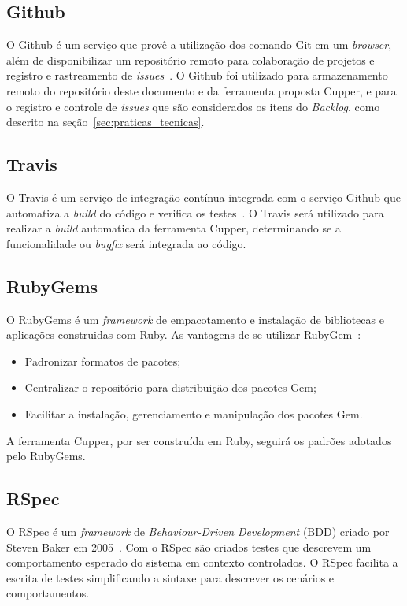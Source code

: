 \subsection{Github}

O Github é um serviço que provê a utilização dos comando Git em um \textit{browser}, além de
disponibilizar um repositório remoto para colaboração de projetos e registro e rastreamento de
\textit{issues}~\cite{github:2016}.  O Github foi utilizado para armazenamento remoto do repositório
deste documento e da ferramenta proposta Cupper, e para o registro e controle de \textit{issues} que são
considerados os itens do \textit{Backlog}, como descrito na seção~\ref{sec:praticas_tecnicas}.

\subsection{Travis}

O Travis é um serviço de integração contínua integrada com o serviço Github que automatiza
a \textit{build} do código e verifica os testes~\cite{travis:2016}. O Travis será utilizado para
realizar a \textit{build} automatica da ferramenta Cupper, determinando se a funcionalidade ou \textit{bugfix}
será integrada ao código.

\subsection{RubyGems}

O RubyGems é um \textit{framework} de empacotamento e instalação de bibliotecas e aplicações
construidas com Ruby. As vantagens de se utilizar RubyGem~\cite{thomas:2001}:

\begin{itemize}
 \item Padronizar formatos de pacotes;
 \item Centralizar o repositório para distribuição dos pacotes Gem;
 \item Facilitar a instalação, gerenciamento e manipulação dos pacotes Gem.
\end{itemize}

A ferramenta Cupper, por ser construída em Ruby, seguirá os padrões adotados
pelo RubyGems.

\subsection{RSpec}

O RSpec é um \textit{framework} de \textit{Behaviour-Driven Development} (BDD)
criado por Steven Baker em 2005~\cite{chelimsky:2010}. Com o RSpec
são criados testes que descrevem um comportamento esperado do sistema
em contexto controlados. O RSpec facilita a escrita de testes simplificando
a sintaxe para descrever os cenários e comportamentos.

